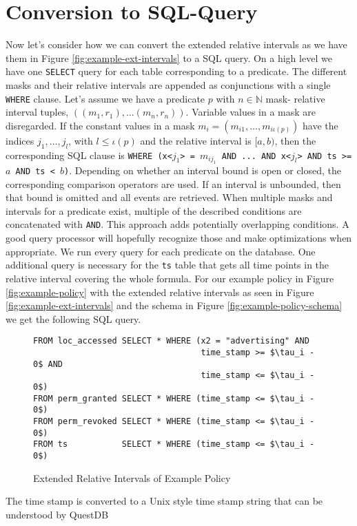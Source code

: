 \section{Conversion to SQL-Query}
Now let's consider how we can convert the extended relative intervals as we have them in Figure \ref{fig:example-ext-intervals} to a SQL query.
On a high level we have one \texttt{SELECT} query for each table corresponding to a predicate. The different masks and their relative intervals are appended as conjunctions with a single \texttt{WHERE} clause.
Let's assume we have a predicate $p$ with $n \in \mathbb{N}$ mask- relative interval tuples, $((m_1, r_1), \dots (m_n,r_n))$.
Variable values in a mask are disregarded.
If the constant values in a mask $m_i = (m_{i1}, \dots, m_{i{\iota(p)}})$ 
have the indices $j_1, \dots, j_l$, with 
$l \leq \iota(p)$
and the relative interval is $[a,b)$, then the corresponding SQL clause is \texttt{WHERE (x<$j_1$> = $m_{ij_1}$ AND ... AND x<$j_l$> AND ts >= $a$ AND ts < $b$)}.
Depending on whether an interval bound is open or closed, the corresponding comparison operators are used.
If an interval is unbounded, then that bound is omitted and all events are retrieved.
When multiple masks and intervals for a predicate exist, multiple of the described conditions are concatenated with \texttt{AND}.
This approach adds potentially overlapping conditions.
A good query processor will hopefully recognize those and make optimizations when appropriate.
We run every query for each predicate on the database.
One additional query is necessary for the \texttt{ts} table that gets all time points in the relative interval covering the whole formula.
For our example policy in Figure \ref{fig:example-policy} with the extended relative intervals as seen in Figure \ref{fig:example-ext-intervals} and the schema in Figure \ref{fig:example-policy-schema} we get the following SQL query.

\begin{figure}[H]
    \label{fig:ext-sql-query}
\begin{lstlisting}
FROM loc_accessed SELECT * WHERE (x2 = "advertising" AND
                                  time_stamp >= $\tau_i - 0$ AND
                                  time_stamp <= $\tau_i - 0$)
FROM perm_granted SELECT * WHERE (time_stamp <= $\tau_i - 0$)
FROM perm_revoked SELECT * WHERE (time_stamp <= $\tau_i - 0$)
FROM ts           SELECT * WHERE (time_stamp <= $\tau_i - 0$)
\end{lstlisting}
    \caption{Extended Relative Intervals of Example Policy}
\end{figure}

The time stamp is converted to a Unix style time stamp string that can be understood by QuestDB \cite{questdb-time-stamps}



